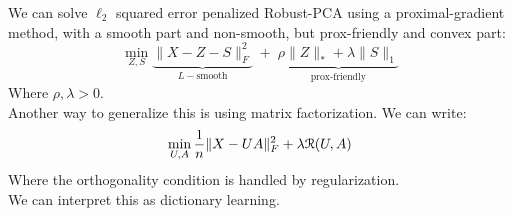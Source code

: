 \documentclass[12pt]{article}
\begin{document}
We can solve $\ell_2$ squared error penalized
Robust-PCA using a proximal-gradient method, 
with a smooth part and non-smooth, but prox-friendly
and convex part:
\[ \min_{Z, S} 
\underbrace{\| X - Z - S \|^2_F}_{L-\text{smooth}} \; + \; 
\underbrace{\rho \|Z\|_* 
+ \lambda \|S\|_1}_{\text{prox-friendly}} \]
Where $\rho, \lambda > 0$. \\ 

Another way to generalize this is using matrix 
factorization. We can write:
\[ \min_{U, A} \frac{1}{n} \| X - UA \|_F^2 
+ \lambda \mathcal{R}(U, A) \]
Where the orthogonality condition is handled by 
regularization. \\

We can interpret this as dictionary learning. \\

\newpage
\end{document}
